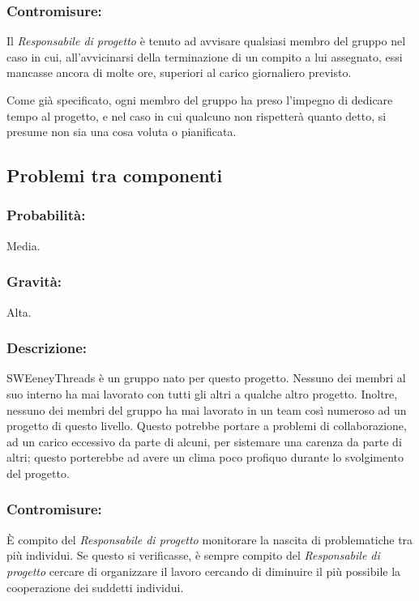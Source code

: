 \documentclass[a4paper]{report}
\begin{document}
				\subsubsection{Contromisure:}
					Il \emph{Responsabile di progetto} è tenuto ad avvisare qualsiasi membro del gruppo 
					nel caso in cui, all'avvicinarsi della terminazione di un compito a lui assegnato, 
					essi mancasse ancora di molte ore, superiori al carico giornaliero previsto. 
					
					Come già specificato, ogni membro del gruppo ha preso l'impegno di dedicare tempo 
					al progetto, e nel caso in cui qualcuno non rispetterà quanto detto, si presume 
					non sia una cosa voluta o pianificata.
			\subsection{Problemi tra componenti}
				\subsubsection{Probabilità:}
					Media.
				\subsubsection{Gravità:}
					Alta.
				\subsubsection{Descrizione:}
					SWEeneyThreads è un gruppo nato per questo progetto. Nessuno dei membri al suo interno 
					ha mai lavorato con tutti gli altri a qualche altro progetto. Inoltre, nessuno dei membri 
					del gruppo ha mai lavorato in un team così numeroso ad un progetto di questo livello. 
					Questo potrebbe portare a problemi di collaborazione, ad un carico eccessivo da parte di 
					alcuni, per sistemare una carenza da parte di altri; questo porterebbe ad avere un clima 
					poco profiquo durante lo svolgimento del progetto.
				\subsubsection{Contromisure:}
					È compito del \emph{Responsabile di progetto} monitorare la nascita di problematiche tra più 
					individui. Se questo si verificasse, è sempre compito del \emph{Responsabile di progetto} 
					cercare di organizzare il lavoro cercando di diminuire il più possibile la cooperazione 
					dei suddetti individui. 
					
\end{document}

